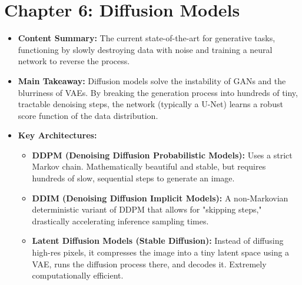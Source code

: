 \section*{Chapter 6: Diffusion Models}
\begin{itemize}
    \item \textbf{Content Summary:} The current state-of-the-art for generative tasks, functioning by slowly destroying data with noise and training a neural network to reverse the process.
    \item \textbf{Main Takeaway:} Diffusion models solve the instability of GANs and the blurriness of VAEs. By breaking the generation process into hundreds of tiny, tractable denoising steps, the network (typically a U-Net) learns a robust score function of the data distribution.
    \item \textbf{Key Architectures:}
    \begin{itemize}
        \item \textbf{DDPM (Denoising Diffusion Probabilistic Models):} Uses a strict Markov chain. Mathematically beautiful and stable, but requires hundreds of slow, sequential steps to generate an image.
        \item \textbf{DDIM (Denoising Diffusion Implicit Models):} A non-Markovian deterministic variant of DDPM that allows for "skipping steps," drastically accelerating inference sampling times.
        \item \textbf{Latent Diffusion Models (Stable Diffusion):} Instead of diffusing high-res pixels, it compresses the image into a tiny latent space using a VAE, runs the diffusion process there, and decodes it. Extremely computationally efficient.
    \end{itemize}
\end{itemize}

